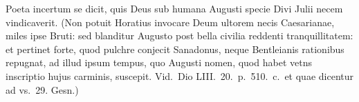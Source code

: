 
Poeta incertum se dicit, quis Deus sub humana Augusti specie Divi Julii necem vindicaverit. (Non potuit Horatius invocare Deum ultorem necis Caesarianae, miles ipse Bruti: sed blanditur Augusto post bella civilia reddenti tranquillitatem: et pertinet forte, quod pulchre conjecit Sanadonus, neque Bentleianis rationibus repugnat, ad illud ipsum tempus, quo Augusti nomen, quod habet vetns inscriptio hujus carminis, suscepit. Vid.\ Dio LIII.\ 20.\ p.\ 510.\ c.\ et quae dicentur ad vs.\ 29. Gesn.)






